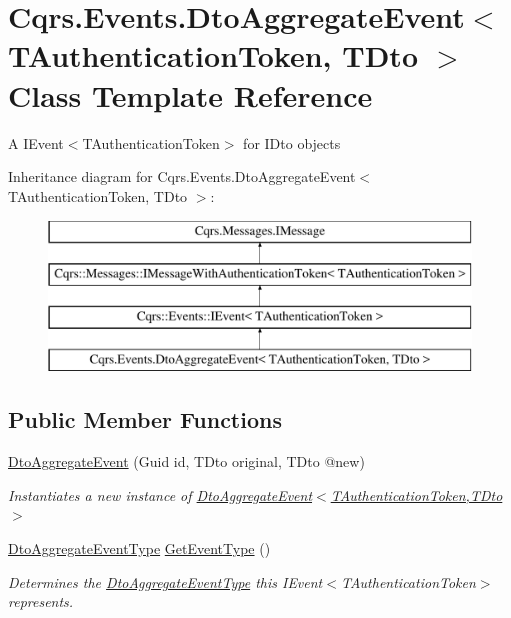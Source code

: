 \hypertarget{classCqrs_1_1Events_1_1DtoAggregateEvent}{}\section{Cqrs.\+Events.\+Dto\+Aggregate\+Event$<$ T\+Authentication\+Token, T\+Dto $>$ Class Template Reference}
\label{classCqrs_1_1Events_1_1DtoAggregateEvent}


A I\+Event$<$\+T\+Authentication\+Token$>$ for I\+Dto objects  


Inheritance diagram for Cqrs.\+Events.\+Dto\+Aggregate\+Event$<$ T\+Authentication\+Token, T\+Dto $>$\+:\begin{figure}[H]
\begin{center}
\leavevmode
\includegraphics[height=4.000000cm]{classCqrs_1_1Events_1_1DtoAggregateEvent}
\end{center}
\end{figure}
\subsection*{Public Member Functions}
\begin{DoxyCompactItemize}
\item 
\hyperlink{classCqrs_1_1Events_1_1DtoAggregateEvent_a9741e3dae73892ee98408547ea953d4d_a9741e3dae73892ee98408547ea953d4d}{Dto\+Aggregate\+Event} (Guid id, T\+Dto original, T\+Dto @new)
\begin{DoxyCompactList}\small\item\em Instantiates a new instance of \hyperlink{classCqrs_1_1Events_1_1DtoAggregateEvent_a9741e3dae73892ee98408547ea953d4d_a9741e3dae73892ee98408547ea953d4d}{Dto\+Aggregate\+Event$<$\+T\+Authentication\+Token,\+T\+Dto$>$} \end{DoxyCompactList}\item 
\hyperlink{namespaceCqrs_1_1Events_a2a32e13adeac92f5a93966cd8ee2d39a_a2a32e13adeac92f5a93966cd8ee2d39a}{Dto\+Aggregate\+Event\+Type} \hyperlink{classCqrs_1_1Events_1_1DtoAggregateEvent_af5bed152d656cb758312f499f87e69de_af5bed152d656cb758312f499f87e69de}{Get\+Event\+Type} ()
\begin{DoxyCompactList}\small\item\em Determines the \hyperlink{namespaceCqrs_1_1Events_a2a32e13adeac92f5a93966cd8ee2d39a_a2a32e13adeac92f5a93966cd8ee2d39a}{Dto\+Aggregate\+Event\+Type} this I\+Event$<$\+T\+Authentication\+Token$>$ represents. \end{DoxyCompactList}\end{DoxyCompactItemize}
